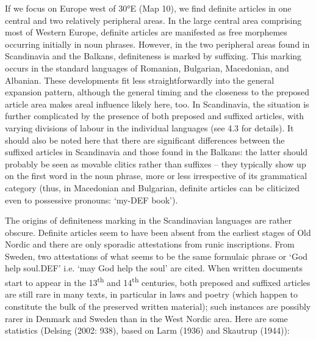 If we focus on Europe west of 30°E (Map 10), we find definite articles in one central and two relatively peripheral areas. In the large central area comprising most of Western Europe, definite articles are manifested as free morphemes occurring initially in noun phrases. However, in the two peripheral areas found in Scandinavia and the Balkans, definiteness is marked by suffixing.  This marking occurs in the standard languages of Romanian, Bulgarian, Macedonian, and Albanian. These developments fit less straightforwardly into the general expansion pattern, although the general timing and the closeness to the preposed article area makes areal influence likely here, too. In Scandinavia, the situation is further complicated by the presence of both preposed and suffixed articles, with varying divisions of labour in the individual languages (see 4.3 for details). It should also be noted here that there are significant differences between the suffixed articles in Scandinavia and those found in the Balkans: the latter should probably be seen as movable clitics rather than suffixes – they typically show up on the first word in the noun phrase, more or less irrespective of its grammatical category (thus, in Macedonian and Bulgarian, definite articles can be cliticized even to possessive pronouns:  ‘my-DEF book’). 

The origins of definiteness marking in the Scandinavian languages are rather obscure. Definite articles seem to have been absent from the earliest stages of Old Nordic and there are only sporadic attestations from runic inscriptions. From Sweden, two attestations of what seems to be the same formulaic phrase or ‘God help soul.DEF’ i.e. ‘may God help the soul’ are cited. When written documents start to appear in the 13\textsuperscript{th} and 14\textsuperscript{th} centuries, both preposed and suffixed articles are still rare in many texts, in particular in laws and poetry (which happen to constitute the bulk of the preserved written material); such instances are possibly rarer in Denmark and Sweden than in the West Nordic area. Here are some statistics (Delsing (2002: 938), based on Larm (1936) and Skautrup (1944)): 

